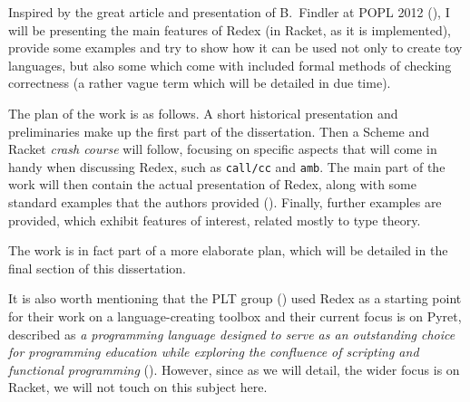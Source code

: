 Inspired by the great article and presentation of B.\ Findler at POPL 2012
(\cite{popl}), I will be presenting the main features of Redex (in Racket,
as it is implemented), provide some examples and try to show how it can be
used not only to create toy languages, but also some which come with included
formal methods of checking correctness (a rather vague term which will be
detailed in due time).

\vspace{0.3cm}

The plan of the work is as follows. A short historical presentation and
preliminaries make up the first part of the dissertation. Then a Scheme
and Racket \emph{crash course} will follow, focusing on specific aspects
that will come in handy when discussing Redex, such as \texttt{call/cc} and
\texttt{amb}. The main part of the work will then contain the actual
presentation of Redex, along with some standard examples that the authors
provided (\cite{amb,long,sewpr}). Finally, further examples are provided,
which exhibit features of interest, related mostly to type theory.

The work is in fact part of a more elaborate plan, which will be detailed
in the final section of this dissertation.

\vspace{0.3cm}

It is also worth mentioning that the PLT group (\cite{pltgrp}) used Redex
as a starting point for their work on a language-creating toolbox and
their current focus is on Pyret, described as \emph{a programming language %
  designed to serve as an outstanding choice for programming education while %
  exploring the confluence of scripting and functional programming}
(\cite{pyret}). However, since as we will detail, the wider focus is on
Racket, we will not touch on this subject here.




